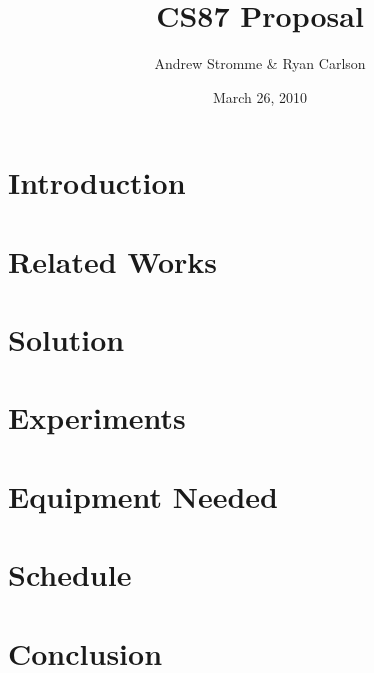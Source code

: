 \documentclass{article}
\begin{document}
\title{CS87 Proposal}
\author{Andrew Stromme \& Ryan Carlson}
\date{March 26, 2010}
\maketitle

\section{Introduction}

\section{Related Works}

\section{Solution}

\section{Experiments}

\section{Equipment Needed}

\section{Schedule}

\section{Conclusion}


%
\end{document}
